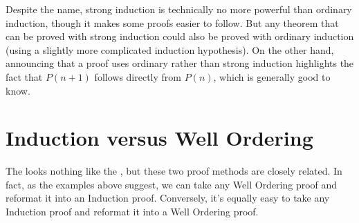 Despite the name, strong induction is technically no more powerful than
ordinary induction, though it makes some proofs easier to follow.  But any
theorem that can be proved with strong induction could also be proved with
ordinary induction (using a slightly more complicated induction
hypothesis).  On the other hand, announcing that a proof uses ordinary
rather than strong induction highlights the fact that $P(n+1)$ follows
directly from $P(n)$, which is generally good to know.

\begin{problems}
\classproblems
{}
\end{problems}


\section{Induction versus Well Ordering}\label{versusWO}

The  looks nothing like the , but these two proof methods are closely related.  In fact,
as the examples above suggest, we can take any Well Ordering proof and
reformat it into an Induction proof.  Conversely, it's equally easy to
take any Induction proof and reformat it into a Well Ordering proof.

\iffalse Here's how to reformat an induction proof and into a Well
Ordering proof : suppose that we have a proof by induction with
hypothesis $P(n)$.  Then we start a Well Ordering proof by assuming the
set of counterexamples to $P$ is nonempty.  Then by Well Ordering there is
a smallest counterexample, $s$, that is, a smallest $s$ such that $P(s)$
is false.

Now we use the proof of $P(0)$ that was part of the Induction proof to
conclude that $s$ must be greater than 0.  Also since $s$ is the smallest
counterexample, we can conclude that $P(s-1)$ must be true.  At this point
we reuse the proof of the inductive step in the Induction proof, which
shows that since $P(s-1)$ true, then $P(s)$ is also true.  This
contradicts the assumption that $P(s)$ is false, so we have the
contradiction needed to complete the Well Ordering Proof that $P(n)$ holds
for all $n \in \naturals$.
\fi

